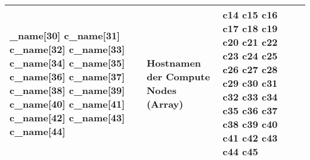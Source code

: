 \begin{longtable}{| p{0.5cm} | p{3cm} | p{8.5cm} | p{4cm} |}
_name[30] \newline c\_name[31] \newline c\_name[32] \newline c\_name[33] \newline c\_name[34] \newline c\_name[35] \newline c\_name[36] \newline c\_name[37] \newline c\_name[38] \newline c\_name[39] \newline c\_name[40] \newline c\_name[41] \newline c\_name[42] \newline c\_name[43] \newline c\_name[44] & Hostnamen der Compute Nodes (Array) &   c14 \newline c15 \newline c16 \newline c17 \newline c18 \newline c19 \newline c20 \newline c21 \newline c22 \newline c23 \newline c24 \newline c25 \newline c26 \newline c27 \newline c28 \newline c29 \newline c30 \newline c31 \newline c32 \newline c33 \newline c34 \newline c35 \newline c36 \newline c37 \newline c38 \newline c39 \newline c40 \newline c41 \newline c42 \newline c43 \newline c44 \newline c45\\\hline 

\end{longtable}
